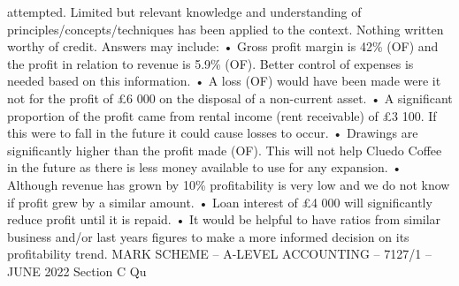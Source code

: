 \documentclass{article}
\begin{document}
attempted.  Limited but relevant knowledge and understanding of \newline
principles/concepts/techniques has been applied to the context.    \newline
Nothing written worthy of credit.  \newline
 \newline
Answers may include: \newline
 \newline
• Gross profit margin is 42\% (OF) and the profit in relation to revenue is 5.9\% (OF).  Better control of \newline
expenses is needed based on this information. \newline
• A loss (OF) would have been made were it not for the profit of £6 000 on the disposal of a non-current \newline
asset. \newline
• A significant proportion of the profit came from rental income (rent receivable) of £3 100.  If this were \newline
to fall in the future it could cause losses to occur. \newline
• Drawings are significantly higher than the profit made (OF).  This will not help Cluedo Coffee in the \newline
future as there is less money available to use for any expansion. \newline
• Although revenue has grown by 10\% profitability is very low and we do not know if profit grew by a \newline
similar amount. \newline
• Loan interest of £4 000 will significantly reduce profit until it is repaid. \newline
• It would be helpful to have ratios from similar business and/or last years figures to make a more \newline
informed decision on its profitability trend. \newline
 \newline
 \newline
 \newline
MARK SCHEME – A-LEVEL ACCOUNTING – 7127/1 – JUNE 2022  \newline
Section C \newline
 \newline
Qu \newline
\end{document}
